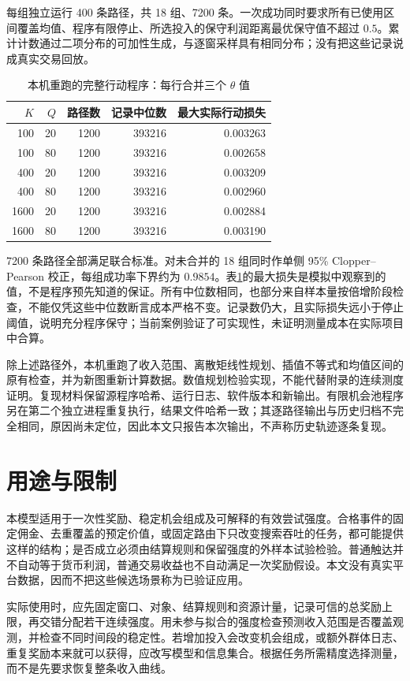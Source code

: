 每组独立运行 400 条路径，共 18 组、7200 条。一次成功同时要求所有已使用区间覆盖均值、程序有限停止、所选投入的保守利润距离最优保守值不超过 $0.5$。累计计数通过二项分布的可加性生成，与逐窗采样具有相同分布；没有把这些记录说成真实交易回放。

\begin{table}[H]\centering
\caption{本机重跑的完整行动程序：每行合并三个 $\theta$ 值}\label{tab:simulation}
\begin{tabular}{rrrrr}\toprule
$K$ & $Q$ & 路径数 & 记录中位数 & 最大实际行动损失\\\midrule
100 &20&1200&393216&0.003263\\
100 &80&1200&393216&0.002658\\
400 &20&1200&393216&0.003209\\
400 &80&1200&393216&0.002960\\
1600&20&1200&393216&0.002884\\
1600&80&1200&393216&0.003190\\\bottomrule
\end{tabular}
\end{table}

7200 条路径全部满足联合标准。对未合并的 18 组同时作单侧 95\% Clopper--Pearson 校正，每组成功率下界约为 $0.9854$。表\ref{tab:simulation}的最大损失是模拟中观察到的值，不是程序预先知道的保证。所有中位数相同，也部分来自样本量按倍增阶段检查，不能仅凭这些中位数断言成本严格不变。记录数仍大，且实际损失远小于停止阈值，说明充分程序保守；当前案例验证了可实现性，未证明测量成本在实际项目中合算。

除上述路径外，本机重跑了收入范围、离散矩线性规划、插值不等式和均值区间的原有检查，并为新图重新计算数据。数值规划检验实现，不能代替附录的连续测度证明。复现材料保留源程序哈希、运行日志、软件版本和新输出。有限机会池程序另在第二个独立进程重复执行，结果文件哈希一致；其逐路径输出与历史归档不完全相同，原因尚未定位，因此本文只报告本次输出，不声称历史轨迹逐条复现。

\section{用途与限制}
本模型适用于一次性奖励、稳定机会组成及可解释的有效尝试强度。合格事件的固定佣金、去重覆盖的预定价值，或固定路由下只改变搜索吞吐的任务，都可能提供这样的结构；是否成立必须由结算规则和保留强度的外样本试验检验。普通触达并不自动等于货币利润，普通交易收益也不自动满足一次奖励假设。本文没有真实平台数据，因而不把这些候选场景称为已验证应用。

实际使用时，应先固定窗口、对象、结算规则和资源计量，记录可信的总奖励上限，再交错分配若干连续强度。用未参与拟合的强度检查预测收入范围是否覆盖观测，并检查不同时间段的稳定性。若增加投入会改变机会组成，或额外群体日志、重复奖励本来就可以获得，应改写模型和信息集合。根据任务所需精度选择测量，而不是先要求恢复整条收入曲线。

